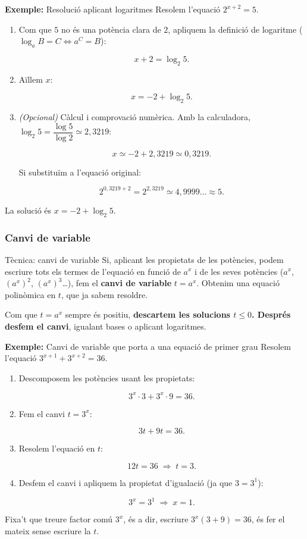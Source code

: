 \begin{exemple}{\textbf{Exemple:} Resolució aplicant logaritmes}
Resolem l'equació $2^{x+2} = 5$.

\begin{enumerate}
\item Com que $5$ no és una potència clara de $2$, apliquem la definició de logaritme ($\log_a B = C \Leftrightarrow a^C = B$):

\[
x+2 = \log_2 5.
\]
\item Aïllem $x$:

\[
x = -2 + \log_2 5.
\]
\item \emph{(Opcional)} Càlcul i comprovació numèrica. Amb la calculadora, $\log_2 5 = \dfrac{\log 5}{\log 2} \simeq 2{,}3219$:

\[
x \simeq -2 + 2{,}3219 \simeq 0{,}3219.
\]

Si substituïm a l'equació original:

\[
2^{0{,}3219+2} = 2^{2{,}3219} \simeq 4{,}9999\ldots \approx 5.
\]
\end{enumerate}

La solució és $x = -2 + \log_2 5$.
\end{exemple}

\subsubsection{Canvi de variable}

\begin{propietat}{Tècnica: canvi de variable}
Si, aplicant les propietats de les potències, podem escriure tots els termes de l'equació en funció de $a^x$ i de les seves potències ($a^x$, $(a^x)^2$, $(a^x)^3$…), fem el \textbf{canvi de variable} $t=a^x$. Obtenim una equació polinòmica en $t$, que ja sabem resoldre.

Com que $t=a^x$ sempre és positiu, \textbf{descartem les solucions $t\leq 0$\textbf{. Després }desfem el canvi}, igualant bases o aplicant logaritmes.
\end{propietat}

\begin{exemple}{\textbf{Exemple:} Canvi de variable que porta a una equació de primer grau}
Resolem l'equació $3^{x+1} + 3^{x+2} = 36$.

\begin{enumerate}
\item Descomposem les potències usant les propietats:

\[
3^x \cdot 3 + 3^x \cdot 9 = 36.
\]
\item Fem el canvi $t=3^x$:

\[
3t + 9t = 36.
\]
\item Resolem l'equació en $t$:

\[
12t = 36 \;\Rightarrow\; t = 3.
\]
\item Desfem el canvi i apliquem la propietat d'igualació (ja que $3 = 3^1$):

\[
3^x = 3^1 \;\Rightarrow\; x=1.
\]
\end{enumerate}

Fixa't que treure factor comú $3^x$, és a dir, escriure $3^x(3+9)=36$, és fer el mateix sense escriure la $t$.
\end{exemple}

